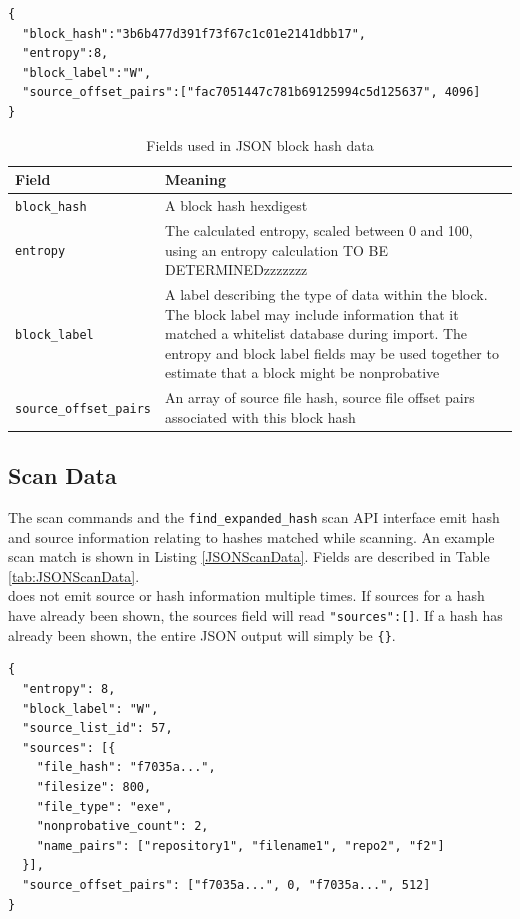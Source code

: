 \documentclass[11pt,fleqn]{article} %
\begin{document}
\lstset{style=customfile}
\begin{lstlisting}[caption={Example JSON block hash data used during import/export}, label=JSONBlockHashData]
{
  "block_hash":"3b6b477d391f73f67c1c01e2141dbb17",
  "entropy":8,
  "block_label":"W",
  "source_offset_pairs":["fac7051447c781b69125994c5d125637", 4096]
}
\end{lstlisting}

\begin{table}[!ht]

\centering
\caption{Fields used in JSON block hash data}
\label{tab:JSONBlockHashData}
\begin{tabular}{|p{5 cm}|p{8.8 cm}|}
\hline \hline
\textbf{Field} & \textbf{Meaning} \\
\hline
\verb+block_hash+ & A block hash hexdigest\\
\hline
\verb+entropy+ & The calculated entropy, scaled between 0 and 100, using an entropy calculation TO BE DETERMINEDzzzzzzz\\
\hline
\verb+block_label+ & A label describing the type of data within the block. The block label may include information that it matched a whitelist database during import. The entropy and block label fields may be used together to estimate that a block might be nonprobative\\
\hline
\verb+source_offset_pairs+ & An array of source file hash, source file offset pairs associated with this block hash\\
\hline
\end{tabular}
\end{table}

\subsection{Scan Data}
The \hdb scan commands and the \verb+find_expanded_hash+ scan API interface emit hash and source information relating to hashes matched while scanning. An example scan match is shown in Listing \ref{JSONScanData}. Fields are described in Table \ref{tab:JSONScanData}.\\

\hdb does not emit source or hash information multiple times.  If sources for a hash have already been shown, the sources field will read \verb+"sources":[]+. If a hash has already been shown, the entire JSON output will simply be \verb+{}+.\\

\lstset{style=customfile}
\begin{lstlisting}[float, caption={Example JSON block hash data output from a scan match}, label=JSONScanData]
{
  "entropy": 8,
  "block_label": "W",
  "source_list_id": 57,
  "sources": [{
    "file_hash": "f7035a...",
    "filesize": 800,
    "file_type": "exe",
    "nonprobative_count": 2,
    "name_pairs": ["repository1", "filename1", "repo2", "f2"]
  }],
  "source_offset_pairs": ["f7035a...", 0, "f7035a...", 512]
}
\end{lstlisting}
\end{document}

